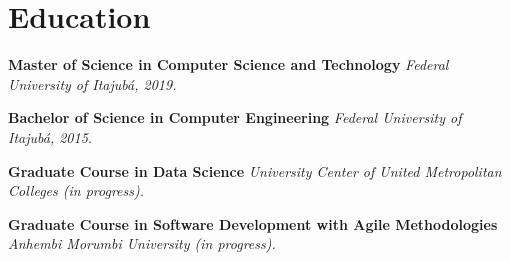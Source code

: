 \documentclass[]{cv-style}          %
\begin{document}

\section{Education}
\vspace{-0.3cm}
\begin{entrylist}
\entry
{}
{\textbf{Master of Science in Computer Science and Technology}}
{}
{\textit{ Federal University of Itajubá, 2019.}}
{}

\entry
{}
{\textbf{Bachelor of Science in Computer Engineering }}
{}
{\textit{ Federal University of Itajubá, 2015.}}
{}

\entry
{}
{\textbf{Graduate Course in Data Science}}
{}
{\textit{University Center of United Metropolitan Colleges (in progress).}}
{}

\entry
{}
{\textbf{Graduate Course in Software Development with Agile Methodologies}}
{}
{\textit{Anhembi Morumbi University (in progress).}}
{}

\end{entrylist}
{\vspace{-0.8cm}}
\end{document}

